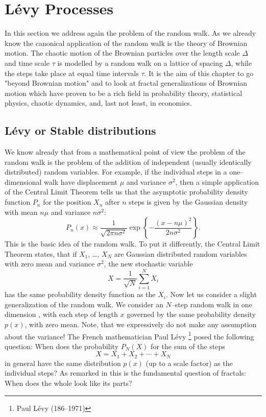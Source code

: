 
\chapter{L\'evy Processes}
In this section we address again the problem of the random walk. As we already
know the canonical application of the random walk is the theory of Brownian
motion. The chaotic motion of the Brownian particles over the length scale
$\Delta$  and time scale $\tau$  is modelled by a random walk on a lattice of
spacing $\Delta$, while the steps take place at equal time intervals 
$\tau$. It is the aim of this chapter to go "beyond Brownian motion"
\cite{Klafter:PhysicsToday} and to look at fractal generalizations of
Brownian motion which have proven to be a rich field in probability theory,
statistical physics, chaotic dynamics, and, last not least, in economics.  

\section{L\'evy or Stable distributions}
We know already that from a mathematical point of view  
the problem of the random walk is the problem of the addition of independent
(usually identically distributed) random variables. For example, if the
individual steps in a one--dimensional walk have displacement $\mu$ and
variance $\sigma^2$, then a simple application of the Central Limit Theorem
tells us that the asymptotic probability density function $P_n$  
for the position $X_n$ after $n$ steps  is given by the Gaussian density with
mean $n\mu$ and variance $n\sigma^2$:
\begin{displaymath}
  P_n(x) \approx \frac{1}{\sqrt{2 \pi n \sigma^2}} \exp 
         \left\{ - \frac{(x- n\mu)^2}{2 n \sigma^2} \right\}.
\end{displaymath}
This is the basic idea of the random walk.  To put it differently, the Central
Limit Theorem states, that if $X_1$, \ldots, $X_N$ are Gaussian distributed
random variables with zero mean and variance $\sigma^2$, the new stochastic
variable 
\begin{displaymath}
  X = \frac{1}{\sqrt{N}} \sum_{i=1}^N X_i
\end{displaymath}
has the same probability density function as the $X_i$.
Now let us consider a slight generalization of the random walk. We consider
an $N$--step random walk in one dimension , with each step of length $x$
governed by the same probability density $p(x)$, with zero mean. Note, that we
expressively do not make any assumption about the variance! The French
mathematician Paul L\'evy \footnote{Paul L\'evy (186--1971)} posed the
following question: When does the probability $P_N(X)$ for the sum of the
steps
\begin{displaymath}
  X = X_1 + X_2 + \cdots + X_N
\end{displaymath}
in general have the same distribution $p(x)$ (up to a scale factor) 
as the individual
steps? As remarked in \cite{Klafter:PhysicsToday} this is the fundamental
question of fractals: When does the whole look like its parts?

